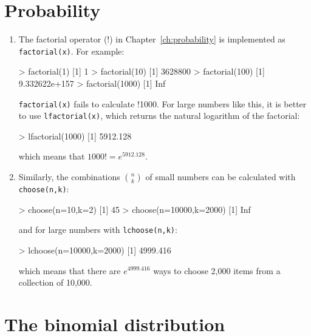 \section{Probability}
\label{sec:R-probability}

\begin{enumerate}

\item The factorial operator (!) in Chapter~\ref{ch:probability} is
  implemented as \texttt{factorial(x)}. For example:

\begin{console}
> factorial(1)
[1] 1
> factorial(10)
[1] 3628800
> factorial(100)
[1] 9.332622e+157
> factorial(1000)
[1] Inf
\end{console}

\texttt{factorial(x)} fails to calculate !1000. For large numbers like
this, it is better to use \texttt{lfactorial(x)}, which returns
the natural logarithm of the factorial:

\begin{console}
> lfactorial(1000)
[1] 5912.128
\end{console}

\noindent which means that $1000!=e^{5912.128}$. 

\item Similarly, the combinations $\binom{n}{k}$ of small numbers can
  be calculated with \texttt{choose(n,k)}:

\begin{console}
> choose(n=10,k=2)
[1] 45
> choose(n=10000,k=2000)
[1] Inf
\end{console}

\noindent and for large numbers with \texttt{lchoose(n,k)}:

\begin{console}
> lchoose(n=10000,k=2000)
[1] 4999.416
\end{console}

\noindent which means that there are $e^{4999.416}$ ways to choose
2,000 items from a collection of 10,000.

\end{enumerate}

\section{The binomial distribution}
\label{sec:R-binomial}

